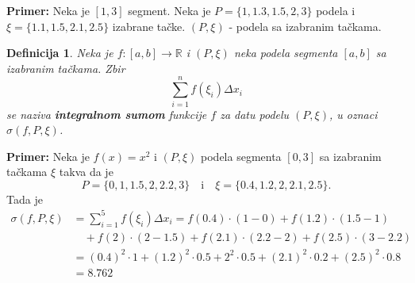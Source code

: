 \documentclass[a4paper,12pt,twoside]{report}
\newtheorem{definition}{Definicija}[section]
\numberwithin{algorithm}{section}
\begin{document}
\vspace{0.5cm}
\noindent \textbf{Primer:} Neka je $[1, 3]$ segment. Neka je $P = \{1, 1.3, 1.5, 2, 3\}$ podela i 
$\xi = \{1.1, 1.5, 2.1, 2.5\}$ izabrane tačke. $(P, \xi)$ - podela sa izabranim tačkama.

\vspace{0.5cm}

\begin{definition}
    Neka je $f: [a, b] \to \mathbb{R}$ i $(P, \xi)$ neka podela segmenta $[a, b]$ sa izabranim tačkama.
    Zbir 
    \[
        \sum_{i=1}^n f(\xi_i) \Delta x_i
    \]
    se naziva \textbf{integralnom sumom} funkcije $f$ za datu podelu $(P, \xi)$, u oznaci 
    $\sigma(f, P, \xi)$.
\end{definition}


\vspace{0.5cm}
\noindent \textbf{Primer:} Neka je $f(x) = x^2$ i $(P, \xi)$ podela segmenta $[0, 3]$ sa izabranim tačkama $\xi$ takva da je
\[
    P = \{0, 1, 1.5, 2, 2.2, 3\} \quad \text{i} \quad \xi = \{0.4, 1.2, 2, 2.1, 2.5\}.
\]
Tada je
\begin{align*}
    \sigma(f, P, \xi) &= \sum_{i=1}^5 f(\xi_i) \Delta x_i = f(0.4) \cdot (1 - 0) + f(1.2) \cdot (1.5 - 1) \\
    &\quad + f(2) \cdot (2 - 1.5) + f(2.1) \cdot (2.2 - 2) + f(2.5) \cdot (3 - 2.2) \\
    &= (0.4)^2 \cdot 1 + (1.2)^2 \cdot 0.5 + 2^2 \cdot 0.5 + (2.1)^2 \cdot 0.2 + (2.5)^2 \cdot 0.8 \\
    &= 8.762
\end{align*}
\end{document}
